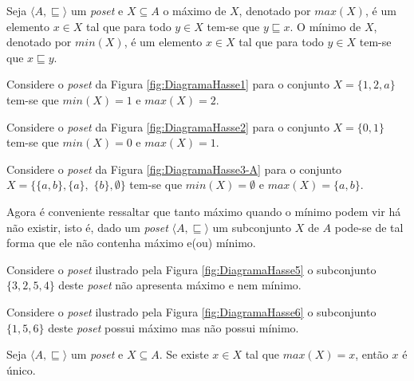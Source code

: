 \begin{definicao}\label{def:MaxMinPoset}
	Seja $\langle A, \sqsubseteq \rangle$ um \textit{poset} e $X \subseteq A$ o máximo de $X$, denotado por $max(X)$, é um elemento $x \in X$ tal que para todo $y \in X$ tem-se que $y \sqsubseteq x$. O mínimo de $X$, denotado por $min(X)$,  é um elemento $x \in X$ tal que  para todo $y \in X$ tem-se que $x \sqsubseteq y$.
\end{definicao}

\begin{exemplo}
	Considere o \textit{poset} da Figura \ref{fig:DiagramaHasse1} para o conjunto $X = \{1, 2, a\}$ tem-se que $min(X) = 1$ e $max(X) = 2$.
\end{exemplo}

\begin{exemplo}
	Considere o \textit{poset} da Figura \ref{fig:DiagramaHasse2} para o conjunto $X = \{0, 1\}$ tem-se que $min(X) = 0$ e $max(X) = 1$.
\end{exemplo}

\begin{exemplo}
	Considere o \textit{poset} da Figura \ref{fig:DiagramaHasse3-A} para o conjunto $X = \{\{a, b\}, \{a\},$ $\{b\}, \emptyset\}$ tem-se que $min(X) = \emptyset$ e $max(X) = \{a, b\}$.
\end{exemplo}

Agora é conveniente ressaltar que tanto máximo quando o mínimo podem vir há não existir, isto é, dado um \textit{poset} $\langle A, \sqsubseteq \rangle$ um subconjunto $X$ de $A$ pode-se de tal forma que ele não contenha máximo e(ou) mínimo.

\begin{exemplo}
	Considere o \textit{poset} ilustrado pela Figura \ref{fig:DiagramaHasse5} o subconjunto $\{3, 2, 5, 4\}$ deste \textit{poset} não apresenta máximo e nem mínimo.
\end{exemplo}

\begin{exemplo}
	Considere o \textit{poset} ilustrado pela Figura \ref{fig:DiagramaHasse6} o subconjunto $\{1, 5, 6\}$ deste \textit{poset} possui máximo mas não possui mínimo.
\end{exemplo}

\begin{teorema}\label{teo:UnicidadeMaximoPoset}
	Seja $\langle A, \sqsubseteq \rangle$ um \textit{poset} e $X \subseteq A$. Se existe $x \in X$ tal que $max(X) = x$, então $x$ é único.
\end{teorema}

